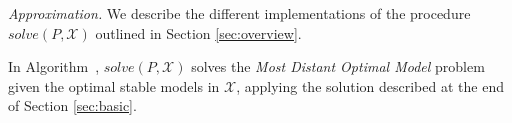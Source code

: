 
\emph{Approximation.}
%
We describe the different implementations of the procedure 
$\mathit{solve}(P,\mathcal{X})$ outlined in Section \ref{sec:overview}. 

%
In Algorithm~, $\mathit{solve}(P,\mathcal{X})$ solves the
\emph{Most Distant Optimal Model} problem given the optimal stable models in $\mathcal{X}$,
applying the solution 
described at the end of Section \ref{sec:basic}. %
%

